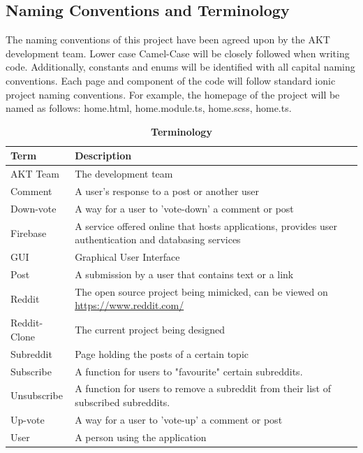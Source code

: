 \documentclass[12pt,fleqn]{article}
\begin{document}

\subsection {Naming Conventions and Terminology}

The naming conventions of this project have been agreed upon by the AKT development team.  Lower case Camel-Case will be closely followed when writing code.  Additionally, constants and enums will be identified with all capital naming conventions.  Each page and component of the code will follow standard ionic project naming conventions. For example, the homepage of the project will be named as follows: home.html, home.module.ts, home.scss, home.ts. 

\begin{table}[H]
\caption{\bf Terminology }
\begin{tabularx}{\textwidth}{p{3cm}X}
\toprule {\bf Term} & {\bf Description}\\
\midrule
\leavevmode\color{red}AKT Team & \leavevmode\color{red}The development team \\
Comment & A user's response to a post or another user \\
\leavevmode\color{red}Down-vote & \leavevmode\color{red}A way for a user to 'vote-down' a comment or post \\
\leavevmode\color{red}Firebase & \leavevmode\color{red}A service offered online that hosts applications, provides user authentication and databasing services \\
\leavevmode\color{red}GUI & \leavevmode\color{red}Graphical User Interface \\
Post & A submission by a user that contains text or a link \\
\leavevmode\color{red}Reddit & \leavevmode\color{red}The open source project being mimicked, can be viewed on \href{https://www.reddit.com/}{https://www.reddit.com/} \\
Reddit-Clone & The current project being designed \\
Subreddit & Page holding the posts of a certain topic \\
\leavevmode\color{red}Subscribe & \leavevmode\color{red}A function for users to "favourite" certain subreddits. \\
\leavevmode\color{red}Unsubscribe & \leavevmode\color{red}A function for users to remove a subreddit from their list of subscribed subreddits. \\ 
\leavevmode\color{red}Up-vote & \leavevmode\color{red}A way for a user to 'vote-up' a comment or post \\
User & A person using the application \\
\bottomrule
\end{tabularx}
\end{table}
\end{document}
